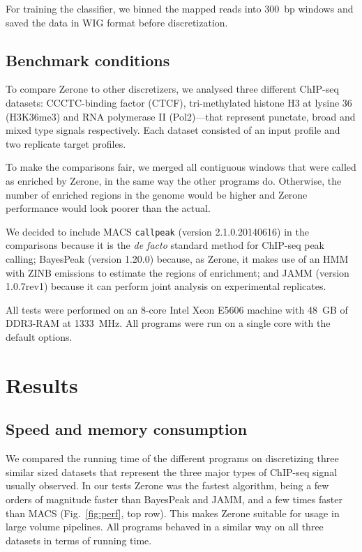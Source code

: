 \documentclass{bioinfo}
\begin{document}
\begin{methods}
For training the classifier, we binned the mapped reads into 300~bp
windows and saved the data in WIG format before discretization.

\subsection{Benchmark conditions}
To compare Zerone to other discretizers, we analysed three different
ChIP-seq datasets: CCCTC-binding factor (CTCF), tri-methylated histone H3 at
lysine 36 (H3K36me3) and RNA polymerase II (Pol2)---that represent punctate,
broad and mixed type signals respectively. Each dataset consisted of an input
profile and two replicate target profiles.

To make the comparisons fair, we merged all contiguous windows that were called
as enriched by Zerone, in the same way the other programs do. Otherwise, the
number of enriched regions in the genome would be higher and Zerone performance
would look poorer than the actual.

We decided to include MACS \texttt{callpeak} (version 2.1.0.20140616) in
the comparisons because it is the \textit{de facto} standard method
for ChIP-seq peak calling; BayesPeak (version 1.20.0) because, as Zerone,
it makes use of an HMM with ZINB emissions to estimate the regions of
enrichment; and JAMM (version 1.0.7rev1) because it can perform joint
analysis on experimental replicates.

All tests were performed on an 8-core Intel Xeon E5606 machine with 48~GB of
DDR3-RAM at 1333~MHz. All programs were run on a single core with the default
options.

\end{methods}

\section{Results}
\label{sec:results}


\subsection{Speed and memory consumption}
We compared the running time of the different programs on discretizing three
similar sized datasets that represent the three major types of ChIP-seq signal
usually observed. In our tests Zerone was the fastest algorithm, being a few
orders of magnitude faster than BayesPeak and JAMM, and a few times faster than
MACS (Fig.~\ref{fig:perf}, top row). This makes Zerone suitable for usage in
large volume pipelines. All programs behaved in a similar way on all three
datasets in terms of running time.
\end{document}
